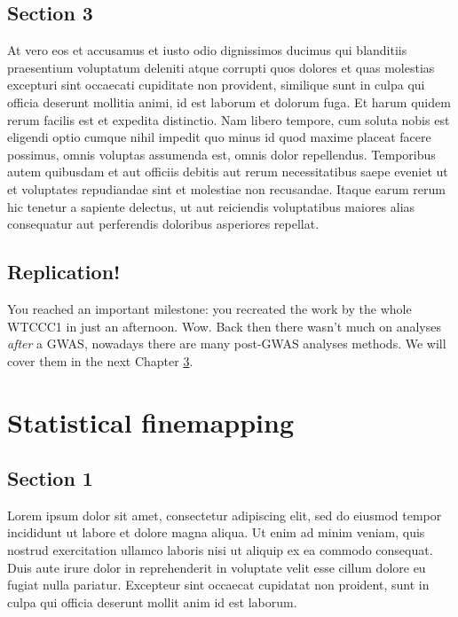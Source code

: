\documentclass[
]{book}
\begin{document}
\hypertarget{section-3}{%
\section{Section 3}\label{section-3}}

At vero eos et accusamus et iusto odio dignissimos ducimus qui blanditiis praesentium voluptatum deleniti atque corrupti quos dolores et quas molestias excepturi sint occaecati cupiditate non provident, similique sunt in culpa qui officia deserunt mollitia animi, id est laborum et dolorum fuga. Et harum quidem rerum facilis est et expedita distinctio. Nam libero tempore, cum soluta nobis est eligendi optio cumque nihil impedit quo minus id quod maxime placeat facere possimus, omnis voluptas assumenda est, omnis dolor repellendus. Temporibus autem quibusdam et aut officiis debitis aut rerum necessitatibus saepe eveniet ut et voluptates repudiandae sint et molestiae non recusandae. Itaque earum rerum hic tenetur a sapiente delectus, ut aut reiciendis voluptatibus maiores alias consequatur aut perferendis doloribus asperiores repellat.

\hypertarget{replication-1}{%
\section{Replication!}\label{replication-1}}

You reached an important milestone: you recreated the work by the whole WTCCC1 in just an afternoon. Wow. Back then there wasn't much on analyses \emph{after} a GWAS, nowadays there are many post-GWAS analyses methods. We will cover them in the next Chapter \ref{finemapping}.

\hypertarget{finemapping}{%
\chapter{Statistical finemapping}\label{finemapping}}

\hypertarget{section-1-1}{%
\section{Section 1}\label{section-1-1}}

Lorem ipsum dolor sit amet, consectetur adipiscing elit, sed do eiusmod tempor incididunt ut labore et dolore magna aliqua. Ut enim ad minim veniam, quis nostrud exercitation ullamco laboris nisi ut aliquip ex ea commodo consequat. Duis aute irure dolor in reprehenderit in voluptate velit esse cillum dolore eu fugiat nulla pariatur. Excepteur sint occaecat cupidatat non proident, sunt in culpa qui officia deserunt mollit anim id est laborum.
\end{document}
